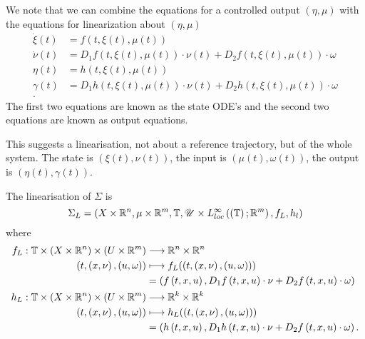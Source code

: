 
We note that we can combine the equations for a controlled output $\left( \eta, \mu \right) $ with the equations for linearization about $\left( \eta, \mu \right) $
\begin{align*}
	\dot{\xi} \left( t \right) &= f \left( t, \xi\left( t \right) , \mu\left( t \right)  \right)  \\
	\dot{\nu} \left( t \right)  &= D_1 f\left( t, \xi\left( t \right) , \mu\left( t \right)  \right) \cdot \nu\left( t \right)  + D_2 f\left( t, \xi\left( t \right) , \mu\left( t \right)  \right) \cdot \omega \\
	\eta\left( t \right) &= h\left( t, \xi\left( t \right) , \mu\left( t \right)  \right)  \\
	\gamma\left( t \right)  &=D_1 h\left( t, \xi\left( t \right) , \mu\left( t \right)  \right) \cdot \nu\left( t \right)  + D_2 h\left( t, \xi\left( t \right) , \mu\left( t \right)  \right) \cdot \omega \\
.\end{align*}
The first two equations are known as the state ODE's and the second two equations are known as output equations.

This suggests a linearisation, not about a reference trajectory, but of the whole system. The state is $\left( \xi\left( t \right) ,\nu\left( t \right)  \right) $, the input is $\left( \mu\left( t \right) , \omega \left( t \right)  \right) $, the output is $\left( \eta\left( t \right) , \gamma\left( t \right)  \right) . $

\begin{definition}
	The linearisation of $\Sigma$ is 
	\[
		\Sigma_{L} = \left( X \times  \mathbb{R}^{n}, \mu \times \mathbb{R}^{m}, \mathbb{T} , \mathscr{U} \times L^{\infty}_{loc}\left( \left( \mathbb{T}  \right) ; \mathbb{R}^{m} \right) , f_L , h_l  \right) 
	\] 
	where 
	\begin{align*} 
		f_L: \mathbb{T} \times \left( X \times  \mathbb{R}^{n} \right) \times \left( U \times \mathbb{R}^{m} \right)  &\longrightarrow \mathbb{R}^{n}\times \mathbb{R}^{n} \\
		\left( t, \left( x, \nu \right) , \left( u, \omega \right)  \right)  &\longmapsto f_L(\left( t, \left( x, \nu \right) , \left( u, \omega \right)  \right) ) \\
										     &= \left( f\left( t, x, u \right) , D_1 f\left( t, x , u  \right) \cdot \nu + D_2 f\left( t, x , u  \right) \cdot \omega  \right) \\ 
		h_L: \mathbb{T} \times \left( X \times  \mathbb{R}^{n} \right) \times \left( U \times \mathbb{R}^{m} \right)  &\longrightarrow \mathbb{R}^{k}\times \mathbb{R}^{k} \\
		\left( t, \left( x, \nu \right) , \left( u, \omega \right)  \right)  &\longmapsto h_L(\left( t, \left( x, \nu \right) , \left( u, \omega \right)  \right) ) \\ 
										     &= \left( h\left( t, x, u \right) , D_1 h\left( t, x , u  \right) \cdot \nu + D_2 f\left( t, x , u  \right) \cdot \omega  \right) 
	.\end{align*}
\end{definition}

